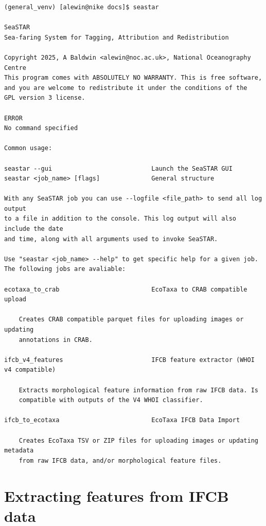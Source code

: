 \documentclass[11pt]{article}
\begin{document}
\begin{lstlisting}
(general_venv) [alewin@nike docs]$ seastar

SeaSTAR
Sea-faring System for Tagging, Attribution and Redistribution

Copyright 2025, A Baldwin <alewin@noc.ac.uk>, National Oceanography Centre
This program comes with ABSOLUTELY NO WARRANTY. This is free software,
and you are welcome to redistribute it under the conditions of the
GPL version 3 license.

ERROR
No command specified

Common usage:

seastar --gui                           Launch the SeaSTAR GUI
seastar <job_name> [flags]              General structure

With any SeaSTAR job you can use --logfile <file_path> to send all log output
to a file in addition to the console. This log output will also include the date
and time, along with all arguments used to invoke SeaSTAR.

Use "seastar <job_name> --help" to get specific help for a given job.
The following jobs are avaliable:

ecotaxa_to_crab                         EcoTaxa to CRAB compatible upload

    Creates CRAB compatible parquet files for uploading images or updating
    annotations in CRAB.

ifcb_v4_features                        IFCB feature extractor (WHOI v4 compatible)

    Extracts morphological feature information from raw IFCB data. Is
    compatible with outputs of the V4 WHOI classifier.

ifcb_to_ecotaxa                         EcoTaxa IFCB Data Import

    Creates EcoTaxa TSV or ZIP files for uploading images or updating metadata
    from raw IFCB data, and/or morphological feature files.

\end{lstlisting}

\section{Extracting features from IFCB data}

\begin{lstlisting}
\end{lstlisting}
\end{document}
